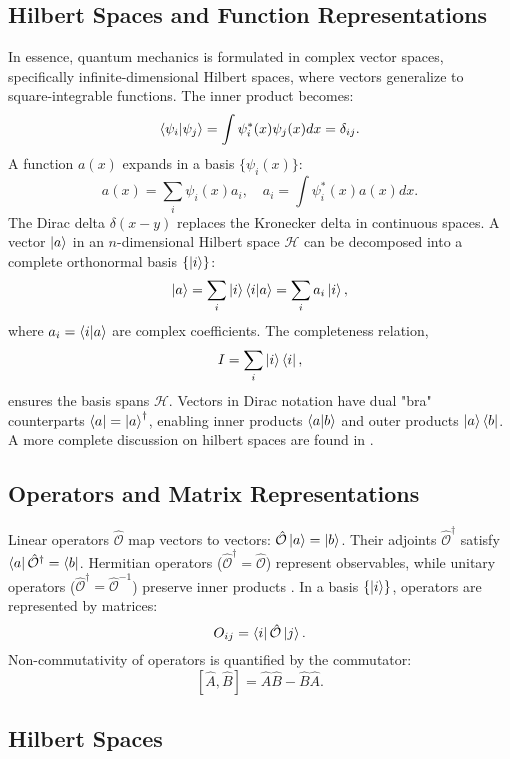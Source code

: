 \subsection{Hilbert Spaces and Function Representations}
In essence, quantum mechanics is formulated in complex vector spaces, specifically infinite-dimensional Hilbert spaces, where vectors generalize to square-integrable functions. The inner product becomes:  
\[
\braket{\psi_i|\psi_j} = \int \psi_i^*(x)\psi_j(x) dx = \delta_{ij}.
\]
A function \(a(x)\) expands in a basis \(\{\psi_i(x)\}\):  
\[
a(x) = \sum_i \psi_i(x) a_i, \quad a_i = \int \psi_i^*(x)a(x) dx.
\]
The Dirac delta \(\delta(x-y)\) replaces the Kronecker delta in continuous spaces.
A vector \(\ket{a}\) in an \(n\)-dimensional Hilbert space \(\mathcal{H}\) can be decomposed into a complete orthonormal basis \(\{\ket{i}\}\):  
\[
\ket{a} = \sum_i \ket{i}\braket{i|a} = \sum_i a_i \ket{i},
\]
where \(a_i = \braket{i|a}\) are complex coefficients. The completeness relation,  
\[
I = \sum_i \ket{i}\bra{i},
\]
ensures the basis spans \(\mathcal{H}\). Vectors in Dirac notation have dual "bra" counterparts \(\bra{a} = \ket{a}^\dagger\), enabling inner products \(\braket{a|b}\) and outer products \(\ket{a}\bra{b}\). A more complete discussion on hilbert spaces are found in \cite{Rudin1976-Analysis}. 

\subsection{Operators and Matrix Representations}
Linear operators \(\hat{\mathcal{O}}\) map vectors to vectors: \(\hat{\mathcal{O}}\ket{a} = \ket{b}\). Their adjoints \(\hat{\mathcal{O}}^\dagger\) satisfy \(\bra{a}\hat{\mathcal{O}}^\dagger = \bra{b}\). Hermitian operators (\(\hat{\mathcal{O}}^\dagger = \hat{\mathcal{O}}\)) represent observables, while unitary operators (\(\hat{\mathcal{O}}^\dagger = \hat{\mathcal{O}}^{-1}\)) preserve inner products \cite{BereraDelDebbio2021-QuantumMechanics,GriffithsSchroeter2018-IntroQM}.
 In a basis \(\{\ket{i}\}\), operators are represented by matrices:  
\[
O_{ij} = \bra{i}\hat{\mathcal{O}}\ket{j}.
\]
Non-commutativity of operators is quantified by the commutator:  
\[
[\hat{A}, \hat{B}] = \hat{A}\hat{B} - \hat{B}\hat{A}.
\]

\subsection{Hilbert Spaces}

